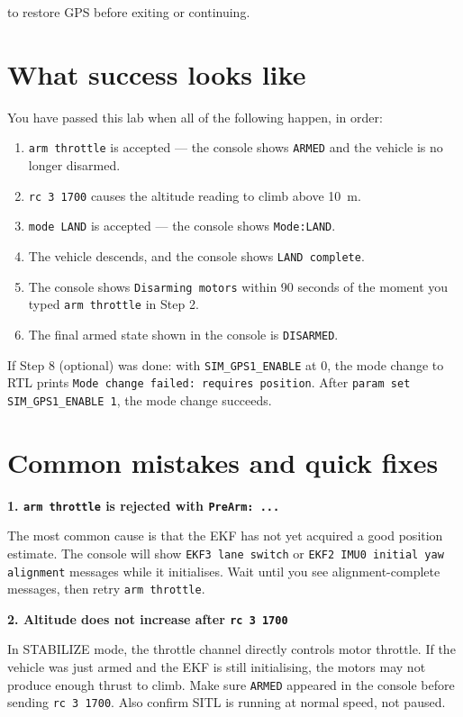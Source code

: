 \documentclass[a4paper,11pt,twoside]{article}
\begin{document}
to restore GPS before exiting or continuing.

\section*{What success looks like}

You have passed this lab when all of the following happen, in order:
\begin{enumerate}
  \item \texttt{arm throttle} is accepted --- the console shows \texttt{ARMED} and the vehicle is no longer disarmed.
  \item \texttt{rc 3 1700} causes the altitude reading to climb above 10~m.
  \item \texttt{mode LAND} is accepted --- the console shows \texttt{Mode:LAND}.
  \item The vehicle descends, and the console shows \texttt{LAND complete}.
  \item The console shows \texttt{Disarming motors} within 90 seconds of the moment you typed \texttt{arm throttle} in Step 2.
  \item The final armed state shown in the console is \texttt{DISARMED}.
\end{enumerate}

If Step 8 (optional) was done: with \texttt{SIM\_GPS1\_ENABLE} at 0, the mode change to RTL prints \texttt{Mode change failed: requires position}. After \texttt{param set SIM\_GPS1\_ENABLE 1}, the mode change succeeds.

\section*{Common mistakes and quick fixes}

\textbf{1. \texttt{arm throttle} is rejected with \texttt{PreArm: ...}}

The most common cause is that the EKF has not yet acquired a good position estimate. The console will show \texttt{EKF3 lane switch} or \texttt{EKF2 IMU0 initial yaw alignment} messages while it initialises. Wait until you see alignment-complete messages, then retry \texttt{arm throttle}.

\textbf{2. Altitude does not increase after \texttt{rc 3 1700}}

In STABILIZE mode, the throttle channel directly controls motor throttle. If the vehicle was just armed and the EKF is still initialising, the motors may not produce enough thrust to climb. Make sure \texttt{ARMED} appeared in the console before sending \texttt{rc 3 1700}. Also confirm SITL is running at normal speed, not paused.
\end{document}
